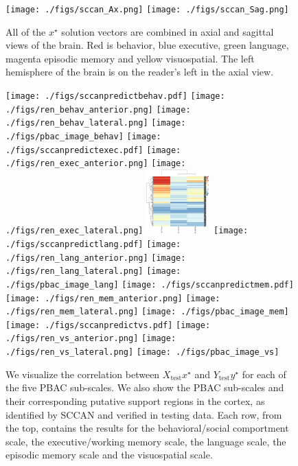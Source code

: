\documentclass[preprint,authoryear,12pt]{elsarticle}
\begin{document}
\begin{figure}[th] \centering
\texttt{[image: ./figs/sccan\_Ax.png]}
\texttt{[image: ./figs/sccan\_Sag.png]}
\caption{All of the $x^\star$ solution vectors are combined in axial and sagittal views of the brain.  Red is behavior, blue executive, green language, magenta episodic memory and yellow visuospatial. The left hemisphere of the brain is on the reader's left in the axial view.}
\label{fig:slices}
\end{figure}


\begin{figure}[th] \centering
\texttt{[image: ./figs/sccanpredictbehav.pdf]}
\texttt{[image: ./figs/ren\_behav\_anterior.png]}
\texttt{[image: ./figs/ren\_behav\_lateral.png]}
\texttt{[image: ./figs/pbac\_image\_behav]}
\texttt{[image: ./figs/sccanpredictexec.pdf]}
\texttt{[image: ./figs/ren\_exec\_anterior.png]}
\texttt{[image: ./figs/ren\_exec\_lateral.png]}
\includegraphics[width=0.22\textwidth]{./figs/pbac_image_exec}
\texttt{[image: ./figs/sccanpredictlang.pdf]}
\texttt{[image: ./figs/ren\_lang\_anterior.png]}
\texttt{[image: ./figs/ren\_lang\_lateral.png]}
\texttt{[image: ./figs/pbac\_image\_lang]}
\texttt{[image: ./figs/sccanpredictmem.pdf]}
\texttt{[image: ./figs/ren\_mem\_anterior.png]}
\texttt{[image: ./figs/ren\_mem\_lateral.png]}
\texttt{[image: ./figs/pbac\_image\_mem]}
\texttt{[image: ./figs/sccanpredictvs.pdf]}
\texttt{[image: ./figs/ren\_vs\_anterior.png]}
\texttt{[image: ./figs/ren\_vs\_lateral.png]}
\texttt{[image: ./figs/pbac\_image\_vs]}
\caption{We visualize the correlation between $X_\text{test} x^\star$ and $Y_\text{test} y^\star$ for each of the five PBAC sub-scales.  We also show the PBAC sub-scales and their corresponding putative support regions in the cortex, as identified by SCCAN and verified in testing data.
Each row, from the top, contains the results for the behavioral/social comportment scale, the executive/working memory scale, the language scale, the episodic memory scale and the visuospatial scale.}
\label{fig:test}
\end{figure}

\end{document}
